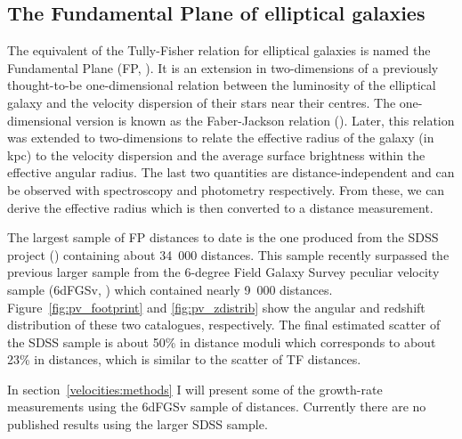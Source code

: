     \subsection{The Fundamental Plane of elliptical galaxies} 
    \label{velocities:measuring:fp}
    
    The equivalent of the Tully-Fisher relation for elliptical galaxies is 
    named the Fundamental Plane (FP, \cite{djorgovskiFundamentalPropertiesElliptical1987}). 
    It is an extension in two-dimensions of a previously thought-to-be one-dimensional 
    relation between the luminosity of the elliptical galaxy and 
    the velocity dispersion of their stars near their centres. The one-dimensional version is 
    known as the Faber-Jackson relation (\cite{faberVelocityDispersionsMasstolight1976}). 
    Later, this relation was extended to two-dimensions to relate the effective radius of the galaxy 
    (in kpc) to the velocity dispersion and the average surface brightness within the effective angular radius. 
    The last two quantities are distance-independent and can be observed with spectroscopy and photometry 
    respectively. From these, we can derive the effective radius which is then converted to a distance measurement. 

    The largest sample of FP distances to date is the one produced from the SDSS project 
    (\cite{howlettSloanDigitalSky2022a}) containing about 34~000 distances. 
    This sample recently surpassed the previous larger sample from the 6-degree Field Galaxy Survey 
    peculiar velocity sample (6dFGSv, \cite{springob6dFGalaxySurvey2014}) which contained nearly 9~000 distances. 
    Figure~\ref{fig:pv_footprint} and \ref{fig:pv_zdistrib} show the angular and redshift distribution 
    of these two catalogues, respectively. 
    The final estimated scatter of the SDSS sample is about 50\% in distance moduli 
    which corresponds to about 23\% in distances, which is similar to the scatter of 
    TF distances. 

    In section~\ref{velocities:methods} I will present some of the growth-rate measurements 
    using the 6dFGSv sample of distances. Currently there are no published results using 
    the larger SDSS sample. 

